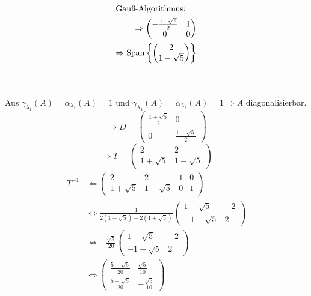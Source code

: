\documentclass{HM}
\newcommand{\Span}{\text{Span}}
\begin{document}
\begin{enumerate}
\begin{enumerate}
\begin{minipage}{.5\textwidth}
\begin{align*}
			\intertext{Gauß-Algorithmus:}
			\Rightarrow\begin{pmatrix}
				-\frac{1-\sqrt{5}}{2}&1\\
				0&0
			\end{pmatrix}\\
			\Rightarrow\Span\left\lbrace\begin{pmatrix}
				2\\
				1-\sqrt{5}
			\end{pmatrix}\right\rbrace
			\end{align*}
		\end{minipage}\\\\
		Aus $\gamma_{\lambda_1}(A)=\alpha_{\lambda_1}(A)=1$ und $\gamma_{\lambda_2}(A)=\alpha_{\lambda_2}(A)=1 \Rightarrow A$ diagonalisierbar.\\
		$$\Rightarrow D=\begin{pmatrix}
			\frac{1+\sqrt{5}}{2}&0\\
			0&\frac{1-\sqrt{5}}{2}
		\end{pmatrix}$$
		$$\Rightarrow T=\begin{pmatrix}
			2&2\\
			1+\sqrt{5}&1-\sqrt{5}
		\end{pmatrix}$$
		\begin{align*}
			T^{-1}&\Leftarrow \begin{pmatrix}
				2&2&1&0\\
				1+\sqrt{5}&1-\sqrt{5}&0&1
			\end{pmatrix}\\
			&\Leftrightarrow\frac{1}{2(1-\sqrt{5})-2(1+\sqrt{5})}\begin{pmatrix}
				1-\sqrt{5}&-2\\
				-1-\sqrt{5}&2
			\end{pmatrix}\\
			&\Leftrightarrow-\frac{\sqrt{5}}{20}\begin{pmatrix}
				1-\sqrt{5}&-2\\
				-1-\sqrt{5}&2
			\end{pmatrix}\\
			&\Leftrightarrow\begin{pmatrix}
				\frac{5-\sqrt{5}}{20}&\frac{\sqrt{5}}{10}\\
				\frac{5+\sqrt{5}}{20}&-\frac{\sqrt{5}}{10}
			\end{pmatrix}\\
		\end{align*}
		

\end{enumerate}
\end{enumerate}
\end{document}
